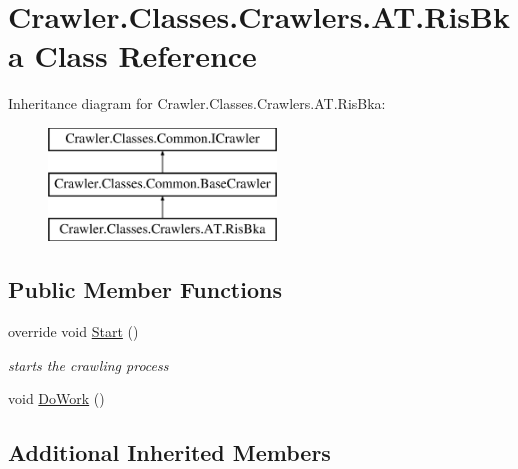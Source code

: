 \hypertarget{class_crawler_1_1_classes_1_1_crawlers_1_1_a_t_1_1_ris_bka}{\section{Crawler.\-Classes.\-Crawlers.\-A\-T.\-Ris\-Bka Class Reference}
\label{class_crawler_1_1_classes_1_1_crawlers_1_1_a_t_1_1_ris_bka}
}
Inheritance diagram for Crawler.\-Classes.\-Crawlers.\-A\-T.\-Ris\-Bka\-:\begin{figure}[H]
\begin{center}
\leavevmode
\includegraphics[height=3.000000cm]{class_crawler_1_1_classes_1_1_crawlers_1_1_a_t_1_1_ris_bka}
\end{center}
\end{figure}
\subsection*{Public Member Functions}
\begin{DoxyCompactItemize}
\item 
override void \hyperlink{class_crawler_1_1_classes_1_1_crawlers_1_1_a_t_1_1_ris_bka_a5ea8a638fe0a890b318cd9af4bc7d929}{Start} ()
\begin{DoxyCompactList}\small\item\em starts the crawling process \end{DoxyCompactList}\item 
void \hyperlink{class_crawler_1_1_classes_1_1_crawlers_1_1_a_t_1_1_ris_bka_a904874b5d4a706ab52096be55954068e}{Do\-Work} ()
\end{DoxyCompactItemize}
\subsection*{Additional Inherited Members}



